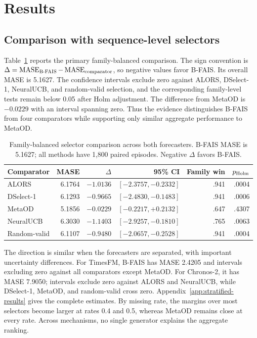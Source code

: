 \documentclass{article}
\newcommand{\bfais}{\textsc{B-FAIS}\xspace}
\newcommand{\mase}{\operatorname{MASE}}
\begin{document}
\section{Results}
\label{sec:results}

\subsection{Comparison with sequence-level selectors}

Table~\ref{tab:selector-main} reports the primary family-balanced comparison. The sign convention is $\Delta=\mase_{\text{\bfais}}-\mase_{\text{comparator}}$, so negative values favor \bfais. Its overall MASE is 5.1627. The confidence intervals exclude zero against ALORS, DSelect-1, NeuralUCB, and random-valid selection, and the corresponding family-level tests remain below 0.05 after Holm adjustment. The difference from MetaOD is $-0.0229$ with an interval spanning zero. Thus the evidence distinguishes \bfais from four comparators while supporting only similar aggregate performance to MetaOD.

\begin{table}[t]
\centering
\small
\setlength{\tabcolsep}{4.2pt}
\caption{Family-balanced selector comparison across both forecasters. \bfais MASE is 5.1627; all methods have 1,800 paired episodes. Negative $\Delta$ favors \bfais.}
\label{tab:selector-main}
\begin{tabular}{lrrrrr}
\toprule
Comparator & MASE & $\Delta$ & 95\% CI & Family win & $p_{\rm Holm}$ \\
\midrule
ALORS & 6.1764 & $-1.0136$ & $[-2.3757,-0.2332]$ & .941 & .0004 \\
DSelect-1 & 6.1293 & $-0.9665$ & $[-2.4830,-0.1483]$ & .941 & .0006 \\
MetaOD & 5.1856 & $-0.0229$ & $[-0.2217,+0.2132]$ & .647 & .4307 \\
NeuralUCB & 6.3030 & $-1.1403$ & $[-2.9257,-0.1810]$ & .765 & .0063 \\
Random-valid & 6.1107 & $-0.9480$ & $[-2.0657,-0.2528]$ & .941 & .0004 \\
\bottomrule
\end{tabular}
\end{table}

The direction is similar when the forecasters are separated, with important uncertainty differences. For TimesFM, \bfais has MASE 2.4205 and intervals excluding zero against all comparators except MetaOD. For Chronos-2, it has MASE 7.9050; intervals exclude zero against ALORS and NeuralUCB, while DSelect-1, MetaOD, and random-valid cross zero. Appendix~\ref{app:stratified-results} gives the complete estimates. By missing rate, the margins over most selectors become larger at rates 0.4 and 0.5, whereas MetaOD remains close at every rate. Across mechanisms, no single generator explains the aggregate ranking.
\end{document}
